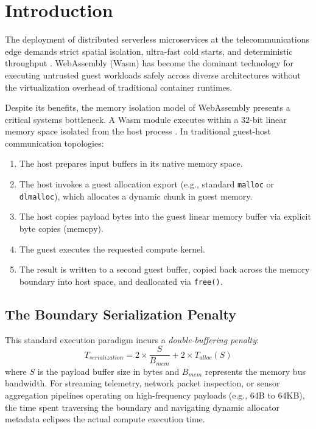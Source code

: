 \section{Introduction}
\label{sec:introduction}

The deployment of distributed serverless microservices at the telecommunications edge demands strict spatial isolation, ultra-fast cold starts, and deterministic throughput \cite{hall2021edge, shillaker2020faasm}. WebAssembly (Wasm) \cite{haas2017bringing} has become the dominant technology for executing untrusted guest workloads safely across diverse architectures without the virtualization overhead of traditional container runtimes.

Despite its benefits, the memory isolation model of WebAssembly presents a critical systems bottleneck. A Wasm module executes within a 32-bit linear memory space isolated from the host process \cite{bono2020sandboxing}. In traditional guest-host communication topologies:
\begin{enumerate}
    \item The host prepares input buffers in its native memory space.
    \item The host invokes a guest allocation export (e.g., standard \texttt{malloc} or \texttt{dlmalloc}), which allocates a dynamic chunk in guest memory.
    \item The host copies payload bytes into the guest linear memory buffer via explicit byte copies ($\text{memcpy}$).
    \item The guest executes the requested compute kernel.
    \item The result is written to a second guest buffer, copied back across the memory boundary into host space, and deallocated via \texttt{free()}.
\end{enumerate}

\subsection{The Boundary Serialization Penalty}
This standard execution paradigm incurs a \textit{double-buffering penalty}:
\begin{equation}
T_{serialization} = 2 \times \frac{S}{B_{mem}} + 2 \times T_{alloc}(S)
\end{equation}
where $S$ is the payload buffer size in bytes and $B_{mem}$ represents the memory bus bandwidth. For streaming telemetry, network packet inspection, or sensor aggregation pipelines operating on high-frequency payloads (e.g., 64B to 64KB), the time spent traversing the boundary and navigating dynamic allocator metadata eclipses the actual compute execution time.

